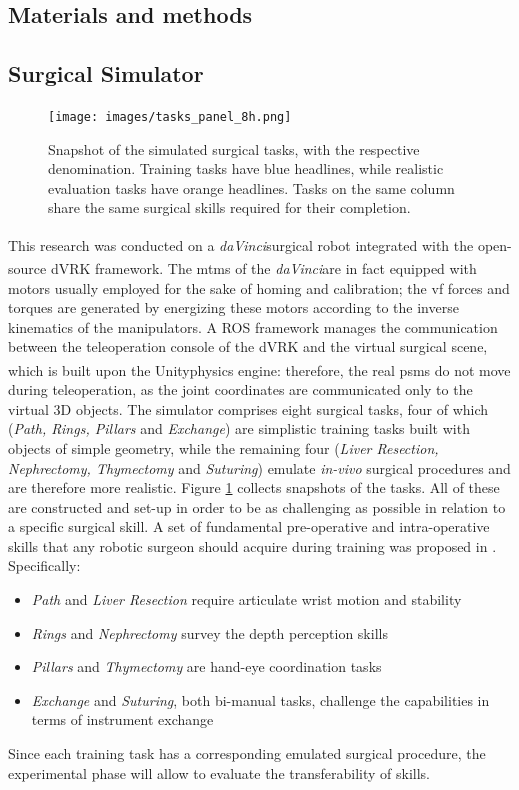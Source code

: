 \documentclass{article}
\newcommand{\cright}{\textsuperscript{\textregistered}\phantom{..}}
\begin{document}
\begin{multicols}{2}
\section{Materials and methods}
\subsection{Surgical Simulator}

\begin{figure}
  \centering
      \texttt{[image: images/tasks\_panel\_8h.png]}
      \caption{Snapshot of the simulated surgical tasks, with the respective denomination. Training tasks have blue headlines, while realistic evaluation tasks have orange headlines. Tasks on the same column share the same surgical skills required for their completion.}
      \label{fig:taskspanel}
\end{figure}

This research was conducted on a \textit{daVinci}\cright surgical robot integrated with the open-source dVRK \cite{Kazanzidesf2014} framework. The \acp{mtm} of the \textit{daVinci}\cright are in fact equipped with motors usually employed for the sake of homing and calibration; the \ac{vf} forces and torques are generated by energizing these motors according to the inverse kinematics of the manipulators. A ROS framework manages the communication between the teleoperation console of the dVRK and the virtual surgical scene, which is built upon the Unity\cright physics engine: therefore, the real \acp{psm} do not move during teleoperation, as the joint coordinates are communicated only to the virtual 3D objects.
The simulator comprises eight surgical tasks, four of which (\textit{Path, Rings, Pillars} and \textit{Exchange}) are simplistic training tasks built with objects of simple geometry, while the remaining four (\textit{Liver Resection, Nephrectomy, Thymectomy} and \textit{Suturing}) emulate \textit{in-vivo} surgical procedures and are therefore more realistic. Figure \ref{fig:taskspanel} collects snapshots of the tasks. All of these are constructed and set-up in order to be as challenging as possible in relation to a specific surgical skill. A set of fundamental pre-operative and intra-operative skills that any robotic surgeon should acquire during training was proposed in \cite{Smith2014}. Specifically:

\begin{itemize}
  \item \textit{Path} and \textit{Liver Resection} require articulate wrist motion and stability
  \item \textit{Rings} and \textit{Nephrectomy} survey the depth perception skills
  \item \textit{Pillars} and \textit{Thymectomy} are hand-eye coordination tasks
  \item \textit{Exchange} and \textit{Suturing}, both bi-manual tasks, challenge the capabilities in terms of instrument exchange 
\end{itemize}
Since each training task has a corresponding emulated surgical procedure, the experimental phase will allow to evaluate the transferability of skills.


\end{multicols}
\end{document}
